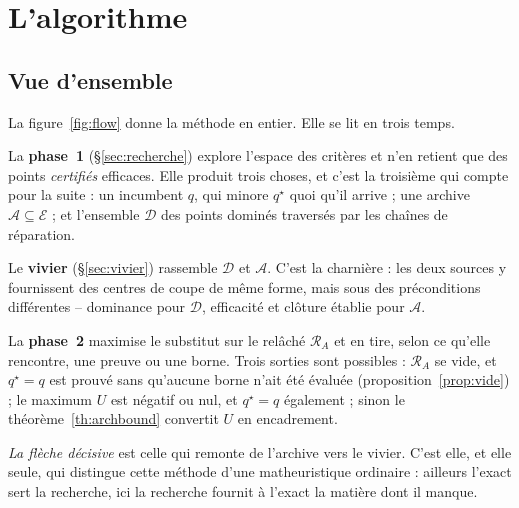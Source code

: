 \documentclass[11pt,a4paper]{article}
\theoremstyle{plain}
\theoremstyle{remark}
\newcommand{\Ecal}{\mathcal{E}}
\newcommand{\Rcal}{\mathcal{R}}
\newcommand{\Acal}{\mathcal{A}}
\newcommand{\qs}{q^{\star}}
\begin{document}
\section{L'algorithme}
\label{sec:algo}

\subsection{Vue d'ensemble}

La figure~\ref{fig:flow} donne la méthode en entier. Elle se lit en trois
temps.

La \textbf{phase~1} (§\ref{sec:recherche}) explore l'espace des critères et
n'en retient que des points \emph{certifiés} efficaces. Elle produit trois
choses, et c'est la troisième qui compte pour la suite : un incumbent $q$,
qui minore $\qs$ quoi qu'il arrive ; une archive $\Acal\subseteq\Ecal$ ; et
l'ensemble $\mathcal{D}$ des points dominés traversés par les chaînes de
réparation.

Le \textbf{vivier} (§\ref{sec:vivier}) rassemble $\mathcal{D}$ et $\Acal$.
C'est la charnière : les deux sources y fournissent des centres de coupe de
même forme, mais sous des préconditions différentes -- dominance pour
$\mathcal{D}$, efficacité et clôture établie pour $\Acal$.

La \textbf{phase~2} maximise le substitut sur le relâché $\Rcal_A$ et en
tire, selon ce qu'elle rencontre, une preuve ou une borne. Trois sorties
sont possibles : $\Rcal_A$ se vide, et $\qs=q$ est prouvé sans qu'aucune
borne n'ait été évaluée (proposition~\ref{prop:vide}) ; le maximum $U$ est
négatif ou nul, et $\qs=q$ également ; sinon le théorème~\ref{th:archbound}
convertit $U$ en encadrement.

\emph{La flèche décisive} est celle qui remonte de l'archive vers le vivier.
C'est elle, et elle seule, qui distingue cette méthode d'une matheuristique
ordinaire : ailleurs l'exact sert la recherche, ici la recherche fournit à
l'exact la matière dont il manque.
\end{document}
